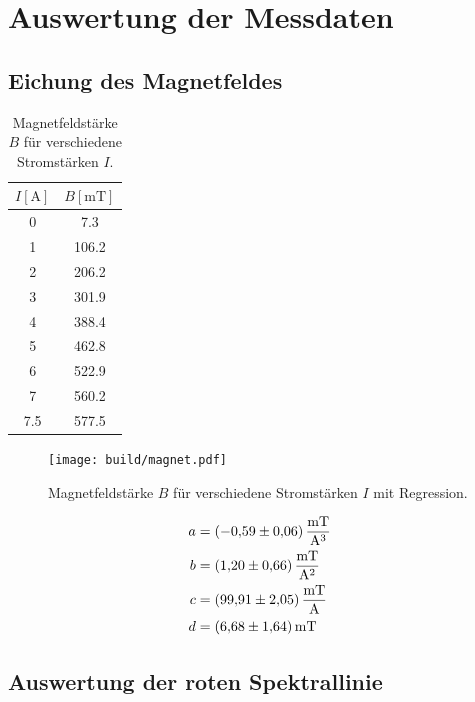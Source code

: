 \section{Auswertung der Messdaten}
\label{sec:Auswertung}

\subsection{Eichung des Magnetfeldes}
\label{sec:magnetfeld}
\begin{table}[H]
    \centering
      \caption{Magnetfeldstärke $B$ für verschiedene Stromstärken $I$.}
      \label{tab:B}
      \begin{tabular}{S[table-format=1.1] S}
        \toprule
        {$I[\si{\ampere}]$} & {$B[\si{\milli\tesla}]$}\\
           &   7.3    \\       
        1   &   106.2  \\
        2   &   206.2  \\
        3   &   301.9  \\
        4   &   388.4  \\
        5   &   462.8  \\
        6   &   522.9  \\
        7   &   560.2  \\
        7.5 &   577.5  \\
        \bottomrule
      \end{tabular}
\end{table}
\noindent

\begin{figure}[H]
    \centering
    \texttt{[image: build/magnet.pdf]}
    \caption{Magnetfeldstärke $B$ für verschiedene Stromstärken $I$ mit Regression.}
    \label{fig:B}
\end{figure}
\noindent

\begin{align*}
    a&=\SI{-0.59\pm 0.06}{\milli\tesla\per\cubic\ampere}\\
    b&=\SI{1.20 \pm 0.66}{\milli\tesla\per\square\ampere}\\
    c&=\SI{99.91\pm 2.05}{\milli\tesla\per\ampere}\\
    d&=\SI{6.68 \pm 1.64}{\milli\tesla}
\end{align*}

\subsection{Auswertung der roten Spektrallinie}
\label{sec:rot}

